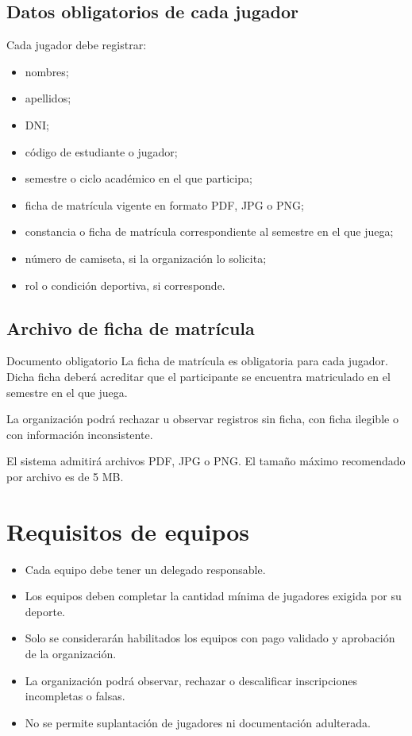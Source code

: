 \documentclass[12pt,a4paper]{article}
\begin{document}
	\subsection{Datos obligatorios de cada jugador}
	
	Cada jugador debe registrar:
	
	\begin{itemize}
		\item nombres;
		\item apellidos;
		\item DNI;
		\item código de estudiante o jugador;
		\item semestre o ciclo académico en el que participa;
		\item ficha de matrícula vigente en formato PDF, JPG o PNG;
		\item constancia o ficha de matrícula correspondiente al semestre en el que juega;
		\item número de camiseta, si la organización lo solicita;
		\item rol o condición deportiva, si corresponde.
	\end{itemize}
	
	\subsection{Archivo de ficha de matrícula}
	
	\begin{cajaAdvertencia}{Documento obligatorio}
		La ficha de matrícula es obligatoria para cada jugador. Dicha ficha deberá acreditar que el participante se encuentra matriculado en el semestre en el que juega.
		
		La organización podrá rechazar u observar registros sin ficha, con ficha ilegible o con información inconsistente.
		
		El sistema admitirá archivos PDF, JPG o PNG. El tamaño máximo recomendado por archivo es de 5 MB.
	\end{cajaAdvertencia}
	
	\section{Requisitos de equipos}
	
	\begin{itemize}
		\item Cada equipo debe tener un delegado responsable.
		\item Los equipos deben completar la cantidad mínima de jugadores exigida por su deporte.
		\item Solo se considerarán habilitados los equipos con pago validado y aprobación de la organización.
		\item La organización podrá observar, rechazar o descalificar inscripciones incompletas o falsas.
		\item No se permite suplantación de jugadores ni documentación adulterada.
	\end{itemize}
	
\end{document}
